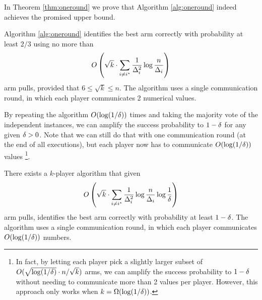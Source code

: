 In Theorem \ref{thm:oneround} we prove that Algorithm \ref{alg:oneround} indeed
achieves the promised upper bound.

\begin{theorem} \label{thm:oneround}
Algorithm \ref{alg:oneround} identifies the best arm correctly with probability at least $2/3$ using no more than
\begin{align} \label{eq:oneround_bound}
	O\left(
		\sqrt{k} \cdot
		\sum_{i \ne i^\star} \frac{1}{\Delta_i^2} \log \frac{n}{\Delta_i} 
	\right) 
\end{align}
arm pulls, provided that $6 \le \sqrt{k} \le n$.
The algorithm uses a single communication round, in which each player communicates 2 numerical values.
\end{theorem}


By repeating the algorithm $O(\log(1/\delta))$ times and taking the majority vote of the independent instances, we can amplify the success probability to $1-\delta$ for any given $\delta > 0$. 
Note that we can still do that with one communication round (at the end of all executions), but each player now has to communicate $O(\log(1/\delta))$ values%
\footnote{In fact, by letting each player pick a slightly larger subset of $O(\sqrt{\log (1/\delta)} \cdot n/\sqrt{k})$ arms, we can amplify the success probability to $1-\delta$ without needing to communicate more than 2 values per player. However, this approach only works when $k = \Omega(\log(1/\delta))$.}. 



\begin{theorem}
There exists a $k$-player algorithm that given
\begin{align*}
	O\left(
		\sqrt{k} \cdot
		\sum_{i \ne i^\star} \frac{1}{\Delta_i^2} \log \frac{n}{\Delta_i} \log \frac{1}{\delta}
	\right)
\end{align*}
arm pulls, identifies the best arm correctly with probability at least $1-\delta$.
The algorithm uses a single communication round, in which each player communicates $O(\log(1/\delta)) $ numbers.
\end{theorem}

